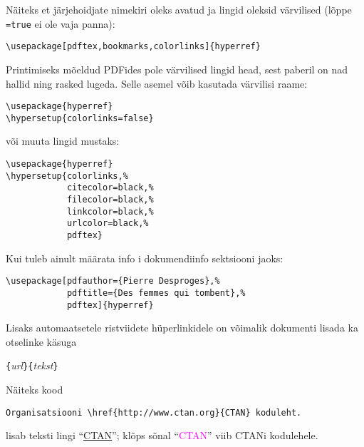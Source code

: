 Näiteks et järjehoidjate nimekiri oleks avatud ja lingid oleksid
värvilised (lõppe \texttt{=true} ei ole vaja panna):
\begin{code}
\begin{verbatim}
\usepackage[pdftex,bookmarks,colorlinks]{hyperref}
\end{verbatim}
\end{code}

Printimiseks mõeldud PDFides pole värvilised lingid
head, sest paberil on nad hallid ning rasked lugeda. Selle asemel võib
kasutada värvilisi raame:
\begin{code}
\begin{verbatim}
\usepackage{hyperref}
\hypersetup{colorlinks=false}
\end{verbatim}
\end{code}
\noindent või muuta lingid mustaks:
\begin{code}
\begin{verbatim}
\usepackage{hyperref}
\hypersetup{colorlinks,%
            citecolor=black,%
            filecolor=black,%
            linkcolor=black,%
            urlcolor=black,%
            pdftex}
\end{verbatim}
\end{code}

Kui tuleb ainult määrata info i dokumendiinfo sektsiooni
jaoks:
\begin{code}
\begin{verbatim}
\usepackage[pdfauthor={Pierre Desproges},%
            pdftitle={Des femmes qui tombent},%
            pdftex]{hyperref}
\end{verbatim}
\end{code}


Lisaks automaatsetele ristviidete hüperlinkidele on
võimalik dokumenti lisada ka otselinke käsuga
\begin{lscommand}
\verb|{|\emph{url}\verb|}{|\emph{tekst}\verb|}|
\end{lscommand}
\noindent Näiteks kood
\begin{code}
\begin{verbatim}
Organisatsiooni \href{http://www.ctan.org}{CTAN} koduleht.
\end{verbatim}
\end{code}
lisab teksti lingi "`\href{http://www.ctan.org}{CTAN}"';
klõps sõnal "`\textcolor{magenta}{CTAN}"' viib CTANi kodulehele.

